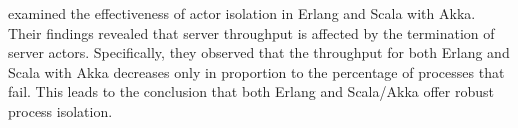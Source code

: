 \textcite{Randtoul2022} examined the effectiveness of actor isolation in Erlang and Scala with Akka. Their findings revealed that server throughput is affected by the termination of server actors. Specifically, they observed that the throughput for both Erlang and Scala with Akka decreases only in proportion to the percentage of processes that fail. This leads to the conclusion that both Erlang and Scala/Akka offer robust process isolation.


